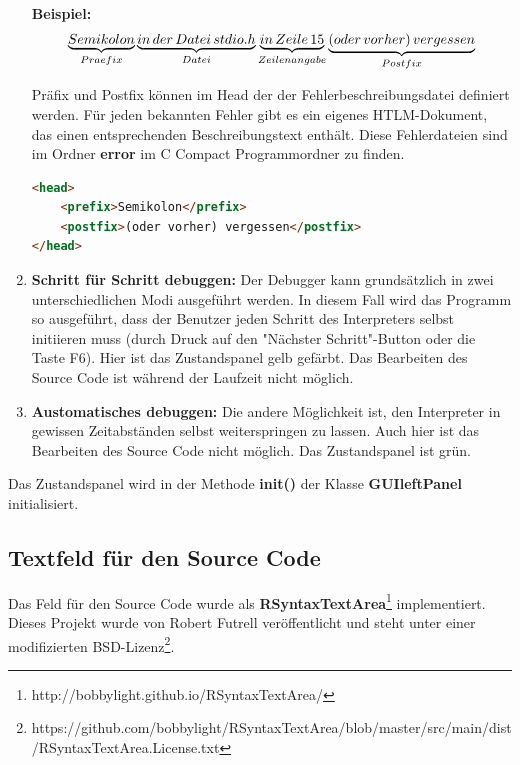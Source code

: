 \begin{enumerate}
\textbf{Beispiel:}
\[
\underbrace{Semikolon}_{Praefix} \underbrace{in\thinspace der\thinspace Datei\thinspace stdio.h}_{Datei} \underbrace{in\thinspace Zeile\thinspace 15}_{Zeilenangabe} \underbrace{(oder\thinspace vorher)\thinspace vergessen}_{Postfix}
\]

Präfix und Postfix können im Head der der Fehlerbeschreibungsdatei definiert werden. Für jeden bekannten Fehler gibt es ein eigenes HTLM-Dokument, das einen entsprechenden Beschreibungstext enthält. Diese Fehlerdateien sind im Ordner \textbf{error} im C Compact Programmordner zu finden.

\begin{lstlisting}[language=HTML]
<head>
	<prefix>Semikolon</prefix>
	<postfix>(oder vorher) vergessen</postfix>
</head>
\end{lstlisting}

\item \textbf{Schritt für Schritt debuggen:} Der Debugger kann grundsätzlich in zwei unterschiedlichen Modi ausgeführt werden. In diesem Fall wird das Programm so ausgeführt, dass der Benutzer jeden Schritt des Interpreters selbst initiieren muss (durch Druck auf den "Nächster Schritt"-Button oder die Taste F6). Hier ist das Zustandspanel gelb gefärbt. Das Bearbeiten des Source Code ist während der Laufzeit nicht möglich.

\item \textbf{Austomatisches debuggen:} Die andere Möglichkeit ist, den Interpreter in gewissen Zeitabständen selbst weiterspringen zu lassen. Auch hier ist das Bearbeiten des Source Code nicht möglich. Das Zustandspanel ist grün.
\end{enumerate}

Das Zustandspanel wird in der Methode \textbf{init()} der Klasse \textbf{GUIleftPanel} initialisiert.

\subsection{Textfeld für den Source Code}
\label{sec:gui-main-left-code}
Das Feld für den Source Code wurde als \textbf{RSyntaxTextArea}\footnote{http://bobbylight.github.io/RSyntaxTextArea/} implementiert. Dieses Projekt wurde von Robert Futrell veröffentlicht und steht unter einer modifizierten BSD-Lizenz\footnote{https://github.com/bobbylight/RSyntaxTextArea/blob/master/src/main/dist/RSyntaxTextArea.License.txt}.

